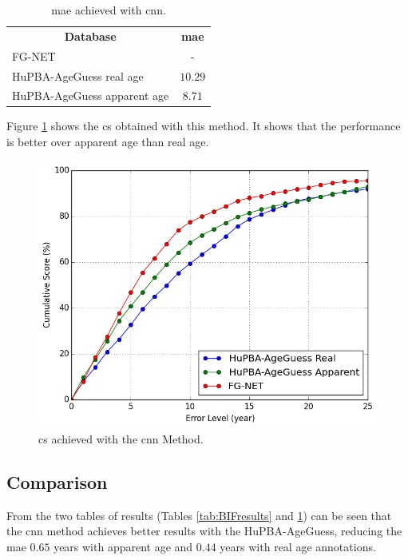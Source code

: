 \begin{table}[!h]
	\centering
	\begin{tabular}{|l||c|}
		\hline
		\multicolumn{1}{|c||}{\textbf{Database}} & \textbf{\gls{mae}}\\ \hhline{=#=}
		FG-NET & - \\ 		\hline
		HuPBA-AgeGuess real age & $10.29$\\ \hline
		HuPBA-AgeGuess apparent age & $8.71$\\ \hline
		
	\end{tabular}
	\caption{\acrshort{mae} achieved with \acrshort{cnn}.}
	\label{tab:CNNresults}
\end{table}

Figure \ref{fig:cumS_CNN} shows the \gls{cs} obtained with this method. It shows that the performance is better over apparent age than real age.

\begin{figure}[!h]
	\centering
	\includegraphics[width=\textwidth]{figures/cum_score}
	\caption{\acrshort{cs} achieved with the \acrshort{cnn} Method.}
	\label{fig:cumS_CNN}
\end{figure}


\subsection{Comparison}

From the two tables of results (Tables \ref{tab:BIFresults} and \ref{tab:CNNresults}) can be seen that the \gls{cnn} method achieves better results with the HuPBA-AgeGuess, reducing the \gls{mae} $0.65$ years with apparent age and $0.44$ years with real age annotations.

